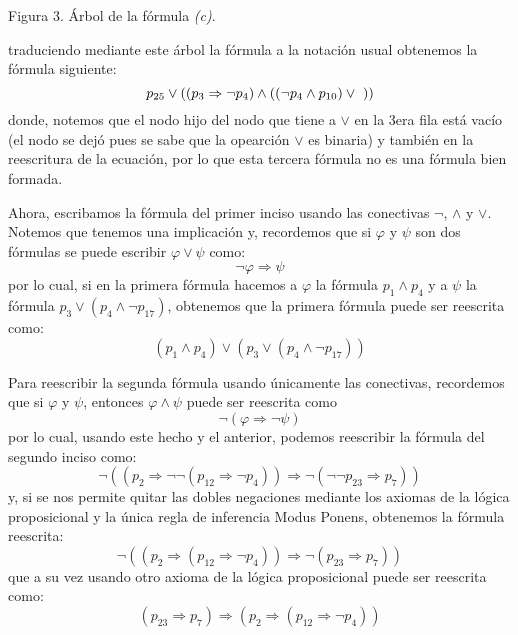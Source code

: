 \documentclass[12pt]{article}
\newcounter{it}
\theoremstyle{largebreak}
\begin{document}
\begin{sol}
\begin{enumerate}
\begin{center}
                Figura 3. Árbol de la fórmula \textit{(c)}.
            \end{center}
            traduciendo mediante este árbol la fórmula a la notación usual obtenemos la fórmula siguiente:
            \begin{equation*}
                p_{25}\lor((p_3\Rightarrow\neg p_4)\land((\neg p_4\land p_{10})\lor\textup{  }))
            \end{equation*}
            donde, notemos que el nodo hijo del nodo que tiene a $\lor$ en la 3era fila está vacío (el nodo se dejó pues se sabe que la opearción $\lor$ es binaria) y también en la reescritura de la ecuación, por lo que esta tercera fórmula no es una fórmula bien formada. 
        \end{enumerate}
        Ahora, escribamos la fórmula del primer inciso usando las conectivas $\neg$, $\land$ y $\lor$. Notemos que tenemos una implicación y, recordemos que si $\varphi$ y $\psi$ son dos fórmulas se puede escribir $\varphi\lor\psi$ como:
        \begin{equation*}
            \neg\varphi\Rightarrow\psi
        \end{equation*}
        por lo cual, si en la primera fórmula hacemos a $\varphi$ la fórmula $p_1\land p_4$ y a $\psi$ la fórmula $p_3\lor(p_4\land\neg p_{17})$, obtenemos que la primera fórmula puede ser reescrita como:
        \begin{equation*}
            (p_1\land p_4)\lor(p_3\lor(p_4\land\neg p_{17}))
        \end{equation*}

        Para reescribir la segunda fórmula usando únicamente las conectivas, recordemos que si $\varphi$ y $\psi$, entonces $\varphi\land\psi$ puede ser reescrita como
        \begin{equation*}
            \neg(\varphi\Rightarrow\neg\psi)
        \end{equation*}
        por lo cual, usando este hecho y el anterior, podemos reescribir la fórmula del segundo inciso como:
        \begin{equation*}
            \neg\left((p_2\Rightarrow\neg\neg(p_{12}\Rightarrow \neg p_4)) \Rightarrow\neg(\neg\neg p_{23}\Rightarrow p_7) \right)
        \end{equation*}
        y, si se nos permite quitar las dobles negaciones mediante los axiomas de la lógica proposicional y la única regla de inferencia Modus Ponens, obtenemos la fórmula reescrita:
        \begin{equation*}
            \neg\left((p_2\Rightarrow(p_{12}\Rightarrow\neg p_4)) \Rightarrow\neg(p_{23}\Rightarrow p_7) \right)
        \end{equation*}
        que a su vez usando otro axioma de la lógica proposicional puede ser reescrita como:
        \begin{equation*}
            (p_{23}\Rightarrow p_7)\Rightarrow(p_2\Rightarrow(p_{12}\Rightarrow\neg p_4))
        \end{equation*}
    \end{sol}
\end{document}
